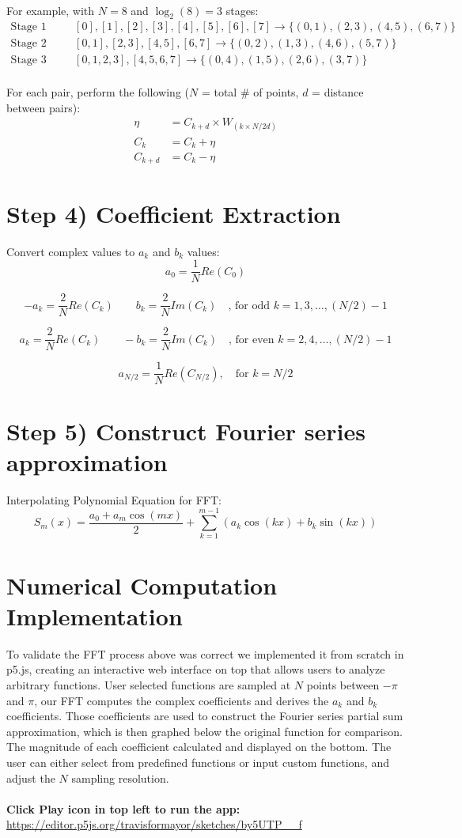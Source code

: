 \documentclass[12pt]{article}
\begin{document}
$ $\\
For example, with $N=8$ and $\log_2(8)=3$ stages:
\begin{align*}
\text{Stage 1 (distance = 1):} & \quad [0],[1],[2],[3],[4],[5],[6],[7] \to \{(0,1),(2,3),(4,5),(6,7)\}\\
\text{Stage 2 (distance = 2):} & \quad [0,1],[2,3],[4,5],[6,7] \to \{(0,2),(1,3),(4,6),(5,7)\}\\
\text{Stage 3 (distance = 4):} & \quad [0,1,2,3],[4,5,6,7] \to \{(0,4),(1,5),(2,6),(3,7)\}
\end{align*}
$ $\\
For each pair, perform the following ($N$ = total \# of points, $d$ = distance between pairs):
\begin{align*}
\eta &= C_{k+d} \times W_{(k\times N/2d)}\\
C_k &= C_k + \eta\\
C_{k+d} &= C_k - \eta
\end{align*}

\section*{Step 4) Coefficient Extraction}
Convert complex values to $a_k$ and $b_k$ values:
\[a_0 = \frac{1}{N}Re(C_0)\]

\[-a_k = \frac{2}{N}Re(C_k) \quad \quad b_k = \frac{2}{N}Im(C_k) \quad \text{, for odd } k=1,3,\ldots,(N/2)-1\]

\[a_k = \frac{2}{N}Re(C_k) \quad \quad -b_k = \frac{2}{N}Im(C_k) \quad \text{, for even } k=2,4,\ldots,(N/2)-1\]

\[a_{N/2} = \frac{1}{N}Re(C_{N/2}), \quad \text{for } k = N/2\]

\section*{Step 5) Construct Fourier series approximation}
Interpolating Polynomial Equation for FFT:
\[S_m(x) = \frac{a_0 + a_m\cos(mx)}{2} + \sum_{k=1}^{m-1}(a_k\cos(kx) + b_k\sin(kx))\]

\section*{Numerical Computation Implementation}
To validate the FFT process above was correct we implemented it from scratch in p5.js, creating an interactive web interface on top that allows users to analyze arbitrary functions. User selected functions are sampled at $N$ points between $-\pi$ and $\pi$, our FFT computes the complex coefficients and derives the $a_k$ and $b_k$ coefficients. Those coefficients are used to construct the Fourier series partial sum approximation, which is then graphed below the original function for comparison. The magnitude of each coefficient calculated and displayed on the bottom. The user can either select from predefined functions or input custom functions, and adjust the $N$ sampling resolution. \\
\\
\textbf{Click Play icon in top left to run the app:} \\
\url{https://editor.p5js.org/travisformayor/sketches/by5UTP__f}
\end{document}
